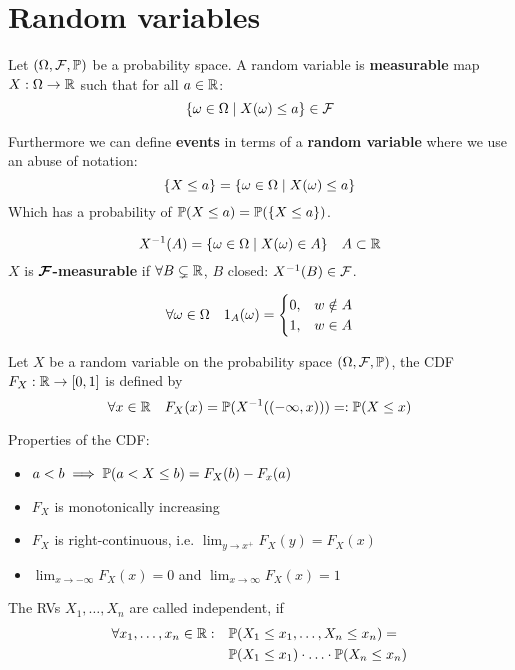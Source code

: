\section{Random variables}

Let \((\O, \F, \P)\) be a probability space. A random variable is \textbf{measurable} map \(X: \Omega \to \R\)  such that for all \(a \in \R\):
\[\{\omega \in \O \mid X(\omega) \leq a\} \in \F\]

Furthermore we can define \textbf{events} in terms of a \textbf{random variable} where we use an abuse of notation:
\[\{X \leq a\} = \{\omega \in \O \mid X(\omega) \leq a\}\]
Which has a probability of \(\P(X \leq a) = \P(\{X \leq a\})\).

\begin{definition*}
  \[X^{-1}(A) = \{\omega \in \O \mid X(\omega) \in A\} \quad A \subset \R\]
  \(X\) is \textbf{\(\bm{\F}\)-measurable} if \(\forall B \subsetneq \R\), \(B\) closed: \(X^{-1}(B) \in \F\).
\end{definition*}

\begin{definition*}
  \[\forall \omega \in \O \quad \I_A(\omega) = \begin{cases}
    0, & w \notin A \\
    1, & w \in A
  \end{cases}\]
\end{definition*}

\begin{definition*}
  Let \(X\) be a random variable on the probability space \((\O, \F, \P)\), the CDF \(F_X: \R \to [0, 1]\) is defined by
  \[\forall x \in \R \quad F_X(x) = \P(X^{-1}((-\infty, x))) =:\P(X \leq x) \]
\end{definition*}
Properties of the CDF:
\begin{itemize}
  \item \(a < b \implies \P(a < X \leq b) = F_X(b) - F_x(a)\)
  \item \(F_X\) is monotonically increasing
  \item \(F_X\) is right-continuous, i.e. \(\lim_{y \to x^+} F_X(y) = F_X(x)\)
  \item \(\lim_{x \to -\infty} F_X (x) = 0\) and \(\lim_{x \to \infty} F_X(x) = 1\)
\end{itemize}

\begin{definition*}
  The RVs \(X_1, \ldots, X_n\) are called independent, if
  \begin{align*}
    \forall x_1, \ldots, x_n \in \R: \quad & \P(X_1 \leq x_1, \ldots, X_n \leq x_n) = \\
    & \P(X_1 \leq x_1) \cdot \ldots \cdot \P(X_n \leq x_n)
  \end{align*}
\end{definition*}

